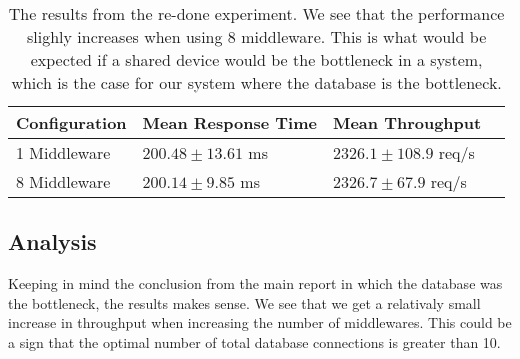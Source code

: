\documentclass[a4paper, 11pt]{article}
\begin{document}
\begin{table}[!htbp]
\centering
    \begin{tabular}{|l|l|l|l|}
    \hline
    Configuration 	& Mean Response Time 			& 	Mean Throughput\\ \hline
    1 Middleware  	& $200.48 \pm 13.61$ ms       	&   $2326.1 \pm 108.9$ req/s  \\ \hline
    8 Middleware 	& $200.14 \pm 9.85$  ms       	&   $2326.7 \pm 67.9$ req/s  \\ \hline
    \end{tabular}
    \label{table}
    \caption{The results from the re-done experiment. We see that the performance slighly increases when using 8 middleware. This is what would be expected if a shared device would be the bottleneck in a system, which is the case for our system where the database is the bottleneck.}
\end{table}
\FloatBarrier %
\subsection{Analysis}
Keeping in mind the conclusion from the main report in which the database was the bottleneck, the results makes sense. We see that we get a relativaly small increase in throughput when increasing the number of middlewares. This could be a sign that the optimal number of total database connections is greater than 10.\\
\end{document}
